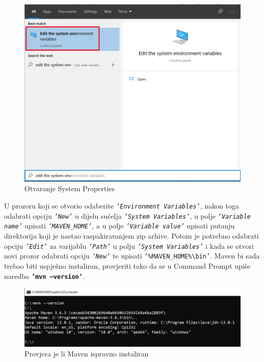 			\begin{figure}[h]
				\centering
				\includegraphics[scale=0.45]{slike/pustanjeupogon/search.png}
				\caption{Otvaranje System Properties}
			\end{figure}
			
			U prozoru koji se otvorio odaberite \texttt{\textit{'Environment Variables'}}, nakon toga odabrati opciju \texttt{\textit{'New'}} u dijelu sučelja \texttt{\textit{'System Variables'}}, u polje \texttt{\textit{'Variable name'}} upisati \texttt{\textit{'MAVEN\_HOME'}}, a u polje \texttt{\textit{'Variable value'}} upisati putanju direktorija koji je nastao raspakiravanjem zip arhive. Potom je potrebno odabrati opciju \texttt{\textit{'Edit'}} za varijablu \texttt{\textit{'Path'}} u polju \texttt{\textit{'System Variables'}} i kada se otvori novi prozor odabrati opciju \texttt{\textit{'New'}} te upisati \texttt{\small '\%MAVEN\_HOME\%\textbackslash bin'}. Maven bi sada trebao biti uspješno instaliran, provjeriti tako da se u Command Prompt upiše naredba \texttt{\textbf{'mvn --version'}}.
			
			\begin{figure}[h]
				\centering
				\includegraphics[scale=0.5]{slike/pustanjeupogon/mavenversion.png}
				\caption{Provjera je li Maven ispravno instaliran}
			\end{figure}
		
